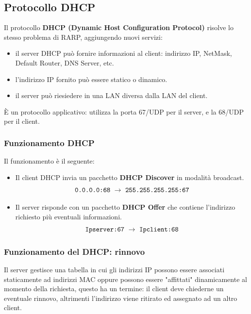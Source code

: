     \subsection{Protocollo DHCP}
        Il protocollo \textbf{DHCP (Dynamic Host Configuration Protocol)} risolve lo stesso problema di RARP, aggiungendo nuovi servizi:
        \begin{itemize}
            \item il server DHCP può fornire informazioni al client: indirizzo IP, NetMask, Default Router, DNS Server, etc.
            \item l'indirizzo IP fornito può essere statico o dinamico.
            \item il server può riesiedere in una LAN diversa dalla LAN del client.
        \end{itemize}

        È un protocollo applicativo: utilizza la porta 67/UDP per il server, e la 68/UDP per il client.

        \subsubsection{Funzionamento DHCP}
            Il funzionamento è il seguente:
            \begin{itemize}
                \item Il client DHCP invia un pacchetto \textbf{DHCP Discover} in modalità broadcast.
                \begin{equation*}
                    \verb-0.0.0.0:68- ~ \rightarrow ~\verb-255.255.255.255:67-
                \end{equation*}
                \item Il server risponde con un pacchetto \textbf{DHCP Offer} che contiene l'indirizzo richiesto più eventuali informazioni.
                \begin{equation*}
                    \verb-Ipserver:67- ~ \rightarrow ~ \verb-Ipclient:68-
                \end{equation*}
            \end{itemize}

        \subsubsection{Funzionamento del DHCP: rinnovo}
            Il server gestisce una tabella in cui gli indirizzi IP possono essere associati staticamente ad indirizzi MAC oppure possono essere "affittati" dinamicamente al momento della richiesta, questo ha un termine: il client deve chiederne un eventuale rinnovo, altrimenti l'indirizzo viene ritirato ed assegnato ad un altro client.
        
